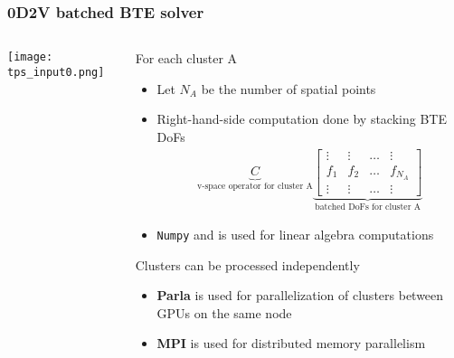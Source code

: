 \documentclass[mathserif, aspectratio=169]{beamer}
\begin{document}
\begin{frame}
	\frametitle{0D2V batched BTE solver}
	\begin{columns}
		\begin{column}{0.4\textwidth}
			\texttt{[image: tps\_input0.png]}
		\end{column}
		\begin{column}{0.6\textwidth}
			For each cluster A
			\begin{itemize}
				\item Let $N_A$ be the number of spatial points
				\item Right-hand-side computation done by stacking BTE DoFs 
				\begin{align*}
					\underbrace{C}_{\text{v-space operator for cluster A}} \underbrace{\begin{bmatrix}
						\vdots & \vdots & \hdots &\vdots\\
						f_1    & f_2    & \hdots & f_{N_A} \\
						\vdots & \vdots & \hdots &\vdots
					\end{bmatrix}}_{\text{batched DoFs for cluster A}}
				\end{align*}
				\item \texttt{Numpy} and  is used for linear algebra computations
			\end{itemize}
			Clusters can be processed independently
			\begin{itemize}
				\item \textbf{Parla} is used for parallelization of clusters between GPUs on the same node
				\item \textbf{MPI} is used for distributed memory parallelism
			\end{itemize}
		\end{column}
	\end{columns}

\end{frame}
\end{document}
